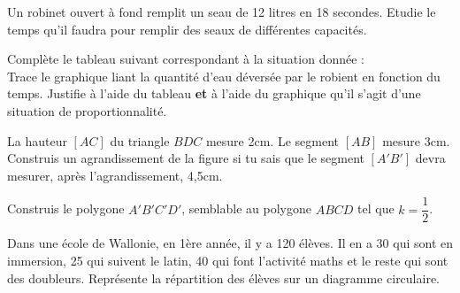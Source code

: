 \documentclass[../math2.tex]{subfiles}
\begin{document}
\begin{exercise}
  Un robinet ouvert à fond remplit un seau de 12 litres en 18 secondes. Etudie le temps qu'il faudra pour remplir des seaux de différentes capacités.
  \begin{tasks}
    \task Complète le tableau suivant correspondant à la situation donnée : \\
    \task Trace le graphique liant la quantité d'eau déversée par le robient en fonction du temps.
    \task Justifie à l'aide du tableau \textbf{et} à l'aide du graphique qu'il s'agit d'une situation de proportionnalité.
  \end{tasks}
\end{exercise}

\begin{exercise}
  La hauteur $[AC]$ du triangle $BDC$ mesure 2cm. Le segment $[AB]$ mesure 3cm. \\
  Construis un agrandissement de la figure si tu sais que le segment $[A'B']$ devra mesurer, après l'agrandissement, 4,5cm.
\end{exercise}

\begin{exercise}
  Construis le polygone $A'B'C'D'$, semblable au polygone $ABCD$ tel que $k=\dfrac{1}{2}$.
\end{exercise}

\begin{exercise}
  Dans une école de  Wallonie,  en  1ère  année,  il  y  a 120 élèves.  Il en  a 30 qui sont en immersion, 25 qui suivent le latin, 40 qui font l’activité maths et le reste qui sont des doubleurs. Représente la répartition des élèves sur un diagramme circulaire.
  \begin{table}[]
    \end{table}
\end{exercise}
\end{document}
